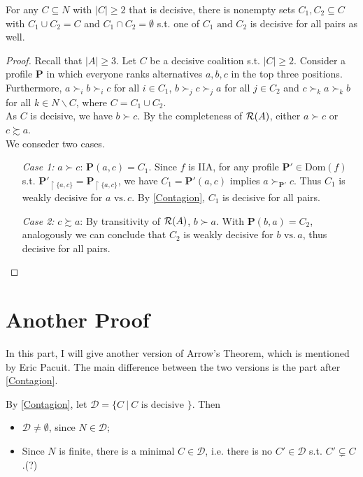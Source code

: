 \begin{lemma}
    \label{Splitting}
    For any $C \subseteq N$ with $|C| \geq 2$ that is decisive, there is nonempty sets $C_1, C_2 \subseteq C$ with $C_1 \cup C_2 = C$ and $C_1 \cap C_2 = \emptyset$ s.t. one of $C_1 \mbox{ and }C_2$ is decisive for all pairs as well.
\end{lemma}

\begin{proof}
    Recall that $|A| \geq 3$. Let $C$ be a decisive coalition s.t. $|C| \geq 2$. Consider a profile $\mathbf{P}$ in which everyone ranks alternatives $a,b,c$ in the top three positions. Furthermore, $a \succ_i b \succ_i c$ for all $i \in C_1$, $b \succ_j c \succ_j a$ for all $j \in C_2$ and $c \succ_k a \succ_k b$ for all $k \in N \backslash C$, where $C = C_1 \cup C_2$.\\
    As $C$ is decisive, we have $b \succ c$. By the completeness of $\mathcal{R}(A)$, either $a \succ c$ or $c \succsim a$. \\
    We conseder two cases.
    \begin{itemize}
        \item[\textit{Case 1:}] $a \succ c$: $\mathbf{P}(a,c) = C_1$. Since $f$ is IIA, for any profile $\mathbf{P'} \in \mathrm{Dom}(f)$ s.t. $\mathbf{P'}_{\upharpoonright\{a,c\}} = \mathbf{P}_{\upharpoonright\{a,c\}}$, we have $C_1 = \mathbf{P'}(a,c)$ implies $a \succ_\mathbf{P'} c$. Thus $C_1$ is weakly decisive for $a \mbox{ vs.} \, c$. By \cref{Contagion}, $C_1$ is decisive for all pairs.
        \item[\textit{Case 2:}] $c \succsim a$: By transitivity of $\mathcal{R}(A)$, $b \succ a$. With $\mathbf{P}(b,a) = C_2$, analogously we can conclude that $C_2$ is weakly decisive for $b \mbox{ vs.} \, a$, thus decisive for all pairs.
    \end{itemize}
\end{proof}

\section{Another Proof}

In this part, I will give another version of Arrow's Theorem, which is mentioned by Eric Pacuit. The main difference between the two versions is the part after \cref{Contagion}.

By \cref{Contagion}, let $\mathcal{D} = \{C \ |\ C \mbox{ is decisive }\}$. Then
\begin{itemize}
    \item $\mathcal{D} \neq \emptyset$, since $N \in \mathcal{D}$;
    \item Since $N$ is finite, there is a minimal $C \in \mathcal{D}$, i.e. there is no $C' \in \mathcal{D}$ s.t. $C' \subsetneq C$.(?)
\end{itemize}

